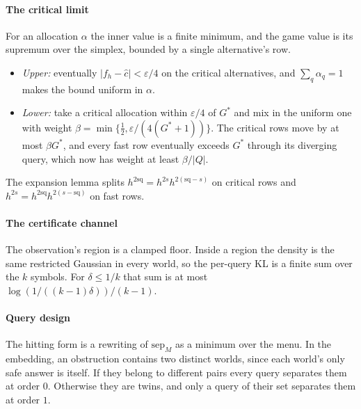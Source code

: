 \paragraph{The critical limit} For an allocation $\alpha$ the inner value is a finite minimum, and
the game value is its supremum over the simplex, bounded by a single alternative's row.
\begin{itemize}
\item \emph{Upper:} eventually $|f_h-\hat c|<\varepsilon/4$ on the critical alternatives, and
$\sum_q\alpha_q=1$ makes the bound uniform in $\alpha$.
\item \emph{Lower:} take a critical allocation within $\varepsilon/4$ of $G^*$ and mix in the
uniform one with weight $\beta=\min\{\frac12,\varepsilon/(4(G^*+1))\}$. The critical rows move by
at most $\beta G^*$, and every fast row eventually exceeds $G^*$ through its diverging query,
which now has weight at least $\beta/|Q|$.
\end{itemize}
The expansion lemma splits $h^{2\mathrm{sq}}=h^{2s}h^{2(\mathrm{sq}-s)}$ on critical rows and
$h^{2s}=h^{2\mathrm{sq}}h^{2(s-\mathrm{sq})}$ on fast rows.

\paragraph{The certificate channel} The observation's region is a clamped floor. Inside a region
the density is the same restricted Gaussian in every world, so the per-query KL is a finite sum
over the $k$ symbols. For $\delta\le1/k$ that sum is at most $\log(1/((k-1)\delta))/(k-1)$.

\paragraph{Query design} The hitting form is a rewriting of $\mathrm{sep}_M$ as a minimum over
the menu. In the embedding, an obstruction contains two distinct worlds, since each world's
only safe answer is itself. If they belong to different pairs every query separates them at
order $0$. Otherwise they are twins, and only a query of their set separates them at order $1$.


